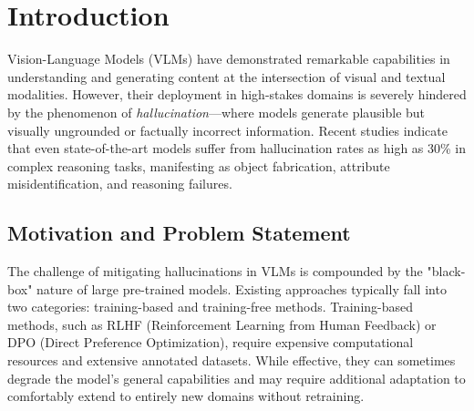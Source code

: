 \providecommand{\revised}[1]{#1}
\section{Introduction}
\label{sec:introduction}

Vision-Language Models (VLMs) have demonstrated remarkable capabilities in understanding and generating content at the intersection of visual and textual modalities. However, their deployment in high-stakes domains is severely hindered by the phenomenon of \textit{hallucination}—where models generate plausible but visually ungrounded or factually incorrect information. Recent studies indicate that even state-of-the-art models suffer from hallucination rates as high as 30\% in complex reasoning tasks, manifesting as object fabrication, attribute misidentification, and reasoning failures.

\subsection{Motivation and Problem Statement}
The challenge of mitigating hallucinations in VLMs is compounded by the "black-box" nature of large pre-trained models. Existing approaches typically fall into two categories: training-based and training-free methods. Training-based methods, such as RLHF (Reinforcement Learning from Human Feedback) or DPO (Direct Preference Optimization), require expensive computational resources and extensive annotated datasets. While effective, they can sometimes degrade the model's general capabilities and may require additional adaptation to comfortably extend to entirely new domains without retraining.

